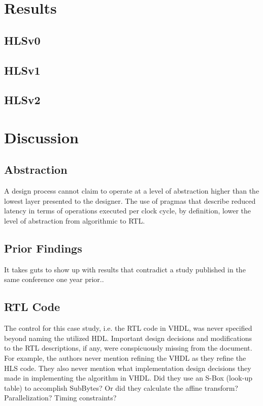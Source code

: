 \documentclass[11pt,journal,compsoc, onecolumn]{IEEEtran}
\begin{document}
\section{Results}
\subsection{HLSv0}
\subsection{HLSv1}
\subsection{HLSv2}
\section{Discussion}
\subsection{Abstraction}
A design process cannot claim to operate at a level of abstraction higher than the lowest layer presented to the designer. The use of pragmas that describe reduced latency in terms of operations executed per clock cycle, by definition, lower the level of abstraction from algorithmic to RTL.
\subsection{Prior Findings}
It takes guts to show up with results that contradict a study published in the same conference one year prior\cite{skalicky}..
\subsection{RTL Code}
The control for this case study, i.e. the RTL code in VHDL, was never specified beyond naming the utilized HDL. Important design decisions and modifications to the RTL descriptions, if any, were conspicuously missing from the document. For example, the authors never mention refining the VHDL as they refine the HLS code. They also never mention what implementation design decisions they made in implementing the algorithm in VHDL. Did they use an S-Box (look-up table) to accomplish SubBytes? Or did they calculate the affine transform? Parallelization? Timing constraints?  
\end{document}
